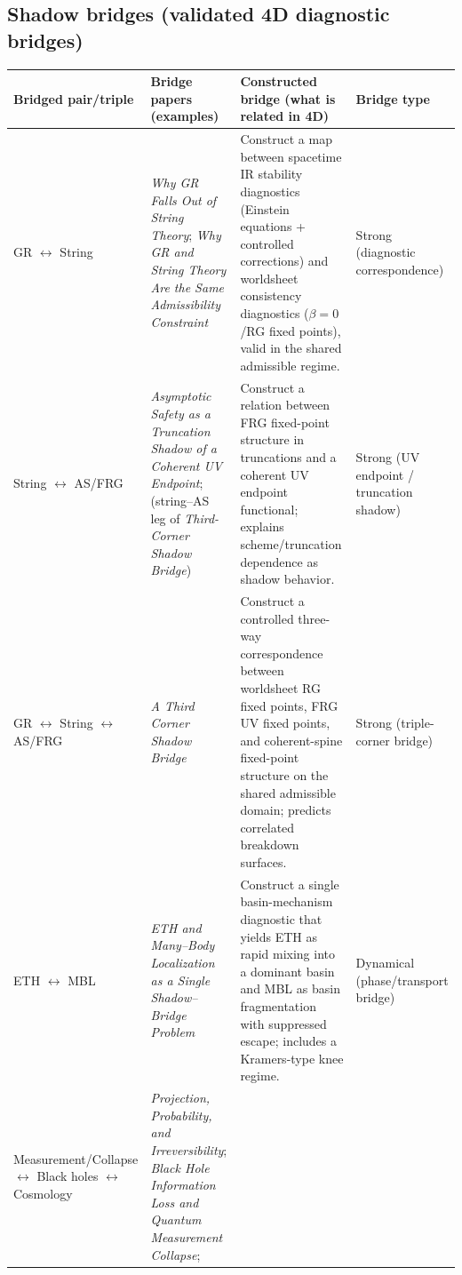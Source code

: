 \documentclass[11pt]{article}
\begin{document}
\subsection*{Shadow bridges (validated 4D diagnostic bridges)}
\begin{center}
\small
\begin{tabular}{|p{3.8cm}|p{4.6cm}|p{5.0cm}|p{3.2cm}|}
\hline
\textbf{Bridged pair/triple} &
\textbf{Bridge papers (examples)} &
\textbf{Constructed bridge (what is related in 4D)} &
\textbf{Bridge type} \\
\hline
GR $\leftrightarrow$ String &
\emph{Why GR Falls Out of String Theory};
\emph{Why GR and String Theory Are the Same Admissibility Constraint} &
Construct a map between spacetime IR stability diagnostics (Einstein equations + controlled corrections) and
worldsheet consistency diagnostics ($\beta=0$/RG fixed points), valid in the shared admissible regime. &
Strong (diagnostic correspondence) \\
\hline
String $\leftrightarrow$ AS/FRG &
\emph{Asymptotic Safety as a Truncation Shadow of a Coherent UV Endpoint};
(string--AS leg of \emph{Third-Corner Shadow Bridge}) &
Construct a relation between FRG fixed-point structure in truncations and a coherent UV endpoint functional;
explains scheme/truncation dependence as shadow behavior. &
Strong (UV endpoint / truncation shadow) \\
\hline
GR $\leftrightarrow$ String $\leftrightarrow$ AS/FRG &
\emph{A Third Corner Shadow Bridge} &
Construct a controlled three-way correspondence between worldsheet RG fixed points, FRG UV fixed points,
and coherent-spine fixed-point structure on the shared admissible domain; predicts correlated breakdown surfaces. &
Strong (triple-corner bridge) \\
\hline
ETH $\leftrightarrow$ MBL &
\emph{ETH and Many--Body Localization as a Single Shadow--Bridge Problem} &
Construct a single basin-mechanism diagnostic that yields ETH as rapid mixing into a dominant basin and
MBL as basin fragmentation with suppressed escape; includes a Kramers-type knee regime. &
Dynamical (phase/transport bridge) \\
\hline
Measurement/Collapse $\leftrightarrow$ Black holes $\leftrightarrow$ Cosmology &
\emph{Projection, Probability, and Irreversibility};
\emph{Black Hole Information Loss and Quantum Measurement Collapse};

\end{tabular}
\end{center}
\end{document}
